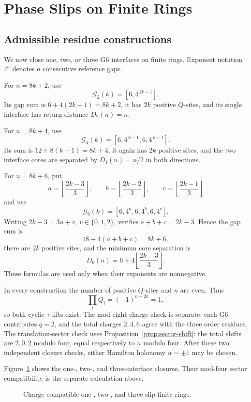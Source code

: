 \section{Phase Slips on Finite Rings}
\label{sec:finite-rings}

\subsection{Admissible residue constructions}
\label{subsec:legal-residue-constructions}

We now close one, two, or three G6 interfaces on finite rings.  Exponent
notation \(4^a\) denotes \(a\) consecutive reference gaps.

For \(n=8k+2\), use
\[
\mathcal G_2(k)=[6,4^{\,2k-1}].
\]
Its gap sum is \(6+4(2k-1)=8k+2\), it has \(2k\) positive \(Q\)-sites,
and its single interface has return distance \(D_2(n)=n\).

For \(n=8k+4\), use
\[
\mathcal G_4(k)=[6,4^{\,k-1},6,4^{\,k-1}].
\]
Its sum is \(12+8(k-1)=8k+4\), it again has \(2k\) positive sites, and
the two interface cores are separated by \(D_4(n)=n/2\) in both directions.

For \(n=8k+6\), put
\[
a=\left\lfloor\frac{2k-3}{3}\right\rfloor,\qquad
b=\left\lfloor\frac{2k-2}{3}\right\rfloor,\qquad
c=\left\lfloor\frac{2k-1}{3}\right\rfloor
\]
and use
\[
\mathcal G_6(k)=[6,4^a,6,4^b,6,4^c].
\]
Writing \(2k-3=3u+v\), \(v\in\{0,1,2\}\), verifies
\(a+b+c=2k-3\).  Hence the gap sum is
\[
18+4(a+b+c)=8k+6,
\]
there are \(2k\) positive sites, and the minimum core separation is
\[
D_6(n)=6+4\left\lfloor\frac{2k-3}{3}\right\rfloor.
\]
These formulas are used only when their exponents are nonnegative.

In every construction the number of positive \(Q\)-sites and \(n\) are
even.  Thus
\[
\prod_iQ_i=(-1)^{n-2k}=1,
\]
so both cyclic \(\tau\)-lifts exist.  The mod-eight charge check is separate:
each G6 contributes \(q=2\), and the total charges \(2,4,6\) agree with the
three order residues.  The translation-sector check uses
Proposition~\ref{prop:sector-shift}: the total shifts are \(2,0,2\) modulo
four, equal respectively to \(n\) modulo four.  After these two independent
closure checks, either Hamilton holonomy \(\alpha=\pm1\) may be chosen.

Figure~\ref{fig:residue-rings} shows the one-, two-, and three-interface
closures. Their mod-four sector compatibility is the separate calculation
above.
\begin{figure}[t]
\centering

\caption{Charge-compatible one-, two-, and three-slip finite rings.}
\label{fig:residue-rings}
\end{figure}

